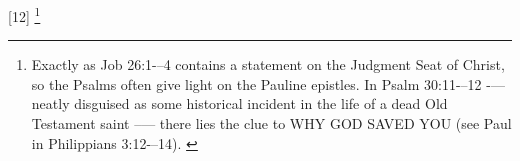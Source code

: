 [12] \footnote{Exactly as Job 26:1-–4 contains a statement on the Judgment Seat of Christ, so the Psalms often give light on the Pauline epistles. In Psalm 30:11-–12  -— neatly disguised as some historical incident in the life of a dead Old Testament saint --— there lies the clue to WHY GOD SAVED YOU (see Paul in Philippians 3:12-–14). \cite{Ruckman1992Psalms}}





